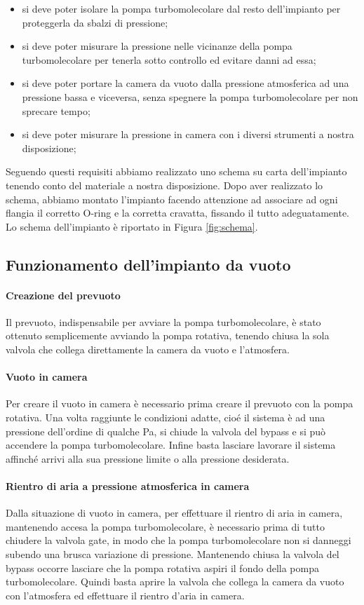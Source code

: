 \begin{itemize}
	\item{si deve poter isolare la pompa turbomolecolare dal resto dell'impianto per proteggerla da sbalzi di pressione;}
	\item{si deve poter misurare la pressione nelle vicinanze della pompa turbomolecolare per tenerla sotto controllo ed evitare danni ad essa;}	
	\item{si deve poter portare la camera da vuoto dalla pressione atmosferica ad una pressione bassa e viceversa, senza spegnere la pompa turbomolecolare per non sprecare tempo;}
	\item{si deve poter misurare la pressione in camera con i diversi strumenti a nostra disposizione;}
\end{itemize}

Seguendo questi requisiti abbiamo realizzato uno schema su carta dell'impianto tenendo conto del materiale a nostra disposizione. Dopo aver realizzato lo schema, abbiamo montato l'impianto facendo attenzione ad associare ad ogni flangia il corretto O-ring e la corretta cravatta, fissando il tutto adeguatamente. Lo schema dell'impianto è riportato in Figura \ref{fig:schema}.

\subsection{Funzionamento dell'impianto da vuoto}
\paragraph{Creazione del prevuoto\\}
Il prevuoto, indispensabile per avviare la pompa turbomolecolare, è stato ottenuto semplicemente avviando la pompa rotativa, tenendo chiusa la sola valvola che collega direttamente la camera da vuoto e l'atmosfera.
\paragraph{Vuoto in camera\\}
Per creare il vuoto in camera è necessario prima creare il prevuoto con la pompa rotativa. Una volta raggiunte le condizioni adatte, cioé il sistema è ad una pressione dell'ordine di qualche \si{\Pa}, si chiude la valvola del bypass e si può accendere la pompa turbomolecolare. Infine basta lasciare lavorare il sistema affinché arrivi alla sua pressione limite o alla pressione desiderata.
\paragraph{Rientro di aria a pressione atmosferica in camera\\}
Dalla situazione di vuoto in camera, per effettuare il rientro di aria in camera, mantenendo accesa la pompa turbomolecolare, è necessario prima di tutto chiudere la valvola gate, in modo che la pompa turbomolecolare non si danneggi subendo una brusca variazione di pressione. Mantenendo chiusa la valvola del bypass occorre lasciare che la pompa rotativa aspiri il fondo della pompa turbomolecolare. Quindi basta aprire la valvola che collega la camera da vuoto con l'atmosfera ed effettuare il rientro d'aria in camera.
